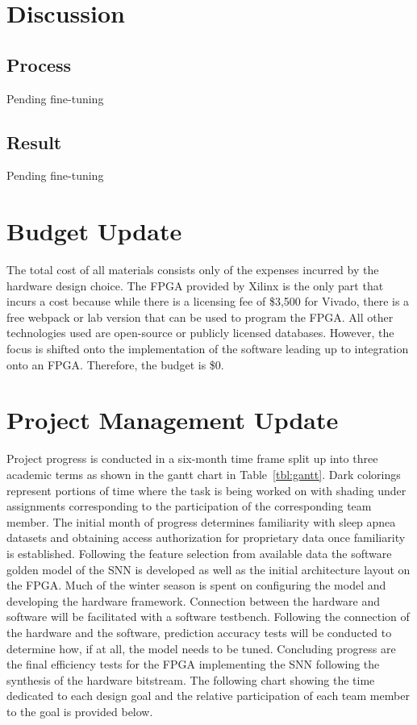 \documentclass[12pt,titlepage]{article}
\begin{document}
\section{Discussion}
\subsection{Process}
Pending fine-tuning

\subsection{Result}
Pending fine-tuning

\section{Budget Update}
The total cost of all materials consists only of the expenses incurred by the hardware design choice. The FPGA provided by Xilinx is
the only part that incurs a cost because while there is a licensing fee of \$3,500 for Vivado, there is a free webpack or lab version
that can be used to program the FPGA. All other technologies used are open-source or publicly licensed databases. However, the focus
is shifted onto the implementation of the software leading up to integration onto an FPGA. Therefore, the budget is \$0.

\section{Project Management Update}
Project progress is conducted in a six-month time frame split up into three academic terms as shown in the gantt chart in Table~\ref{tbl:gantt}.
Dark colorings represent portions of time where the task is being worked on with shading under assignments corresponding to the participation of
the corresponding team member. The initial month of progress determines familiarity with sleep
apnea datasets and obtaining access authorization for proprietary data once familiarity is established. Following the feature selection from available data
the software golden model of the SNN is developed as well as the initial architecture layout on the FPGA. Much of the winter season is spent on configuring
the model and developing the hardware framework. Connection between the hardware and software will be facilitated with a software testbench. Following the
connection of the hardware and the software, prediction accuracy tests will be conducted to determine how, if at all, the model needs to be tuned. Concluding
progress are the final efficiency tests for the FPGA implementing the SNN following the synthesis of the hardware bitstream. The following chart showing the
time dedicated to each design goal and the relative participation of each team member to the goal is provided below.
\end{document}
